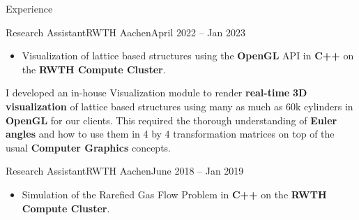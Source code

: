 \begin{cvsection}{Experience}
		\begin{cvsubsection}{Research Assistant}{RWTH Aachen}{April 2022 -- Jan 2023}
		\begin{itemize}
			\item Visualization of lattice based structures using the \textbf{OpenGL} API in \textbf{C++} on the \textbf{RWTH Compute Cluster}.
		\end{itemize}
		I developed an in-house Visualization module to render \textbf{real-time} \textbf{3D visualization} of lattice based structures using many as much as 60k cylinders in \textbf{OpenGL} for our clients.
		This required the thorough understanding of \textbf{Euler angles} and how to use them in 4 by 4 transformation matrices on top of the usual \textbf{Computer Graphics} concepts.
	\end{cvsubsection}
		\begin{cvsubsection}{Research Assistant}{RWTH Aachen}{June 2018 -- Jan 2019}
		\begin{itemize}
			\item Simulation of the Rarefied Gas Flow Problem in \textbf{C++} on the \textbf{RWTH Compute Cluster}.
		\end{itemize}
	\end{cvsubsection}
\end{cvsection}